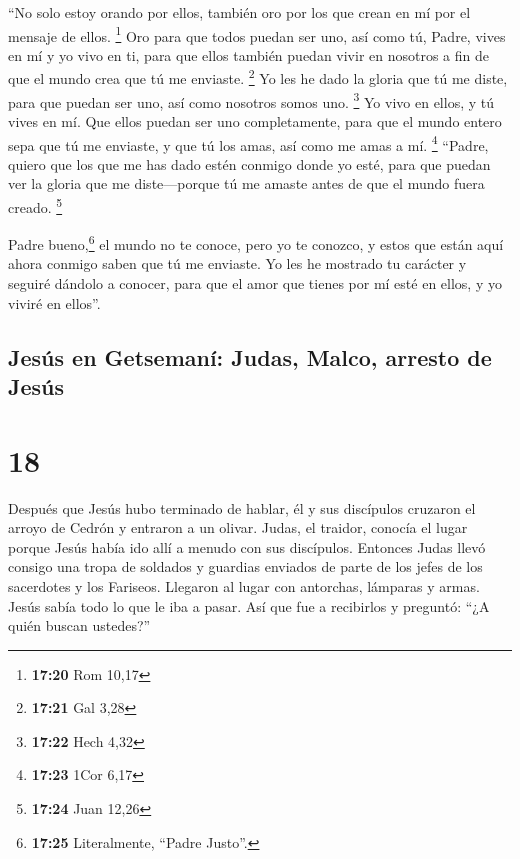  ``No solo estoy orando por ellos, también oro por los
que crean en mí por el mensaje de ellos. \footnote{\textbf{17:20} Rom
  10,17}  Oro para que todos puedan ser uno, así como tú,
Padre, vives en mí y yo vivo en ti, para que ellos también puedan vivir
en nosotros a fin de que el mundo crea que tú me enviaste. \footnote{\textbf{17:21}
  Gal 3,28}  Yo les he dado la gloria que tú me diste,
para que puedan ser uno, así como nosotros somos uno. \footnote{\textbf{17:22}
  Hech 4,32}  Yo vivo en ellos, y tú vives en mí. Que
ellos puedan ser uno completamente, para que el mundo entero sepa que tú
me enviaste, y que tú los amas, así como me amas a mí. \footnote{\textbf{17:23}
  1Cor 6,17}  ``Padre, quiero que los que me has dado
estén conmigo donde yo esté, para que puedan ver la gloria que me
diste---porque tú me amaste antes de que el mundo fuera creado.
\footnote{\textbf{17:24} Juan 12,26}

 Padre bueno,\footnote{\textbf{17:25} Literalmente,
  ``Padre Justo''.} el mundo no te conoce, pero yo te conozco, y estos
que están aquí ahora conmigo saben que tú me enviaste. 
Yo les he mostrado tu carácter y seguiré dándolo a conocer, para que el
amor que tienes por mí esté en ellos, y yo viviré en ellos''.

\hypertarget{jesuxfas-en-getsemanuxed-judas-malco-arresto-de-jesuxfas}{%
\subsection{Jesús en Getsemaní: Judas, Malco, arresto de
Jesús}\label{jesuxfas-en-getsemanuxed-judas-malco-arresto-de-jesuxfas}}

\hypertarget{section-17}{%
\section{18}\label{section-17}}

 Después que Jesús hubo terminado de hablar, él y sus
discípulos cruzaron el arroyo de Cedrón y entraron a un olivar.
 Judas, el traidor, conocía el lugar porque Jesús había
ido allí a menudo con sus discípulos.  Entonces Judas
llevó consigo una tropa de soldados y guardias enviados de parte de los
jefes de los sacerdotes y los Fariseos. Llegaron al lugar con antorchas,
lámparas y armas.  Jesús sabía todo lo que le iba a pasar.
Así que fue a recibirlos y preguntó: ``¿A quién buscan ustedes?''

